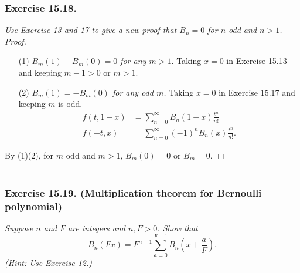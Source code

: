 \documentclass{article}
\begin{document}



\subsubsection*{Exercise 15.18.}
\emph{Use Exercise 13 and 17 to give a new proof that
$B_n = 0$ for $n$ odd and $n > 1$.} \\

\emph{Proof.}
\begin{enumerate}
\item[(1)]
\emph{$B_m(1) - B_m(0) = 0$ for any $m > 1$.}
Taking $x = 0$ in Exercise 15.13 and keeping $m - 1 > 0$ or $m > 1$.
\item[(2)]
\emph{$B_m(1) = -B_m(0)$ for any odd $m$.}
Taking $x = 0$ in Exercise 15.17 and keeping $m$ is odd.
\begin{align*}
f(t, 1-x)
&= \sum_{n=0}^{\infty} B_n(1-x) \frac{t^n}{n!} \\
f(-t, x)
&= \sum_{n=0}^{\infty} (-1)^n B_n(x) \frac{t^n}{n!}.
\end{align*}
\end{enumerate}
By (1)(2), for $m$ odd and $m > 1$, $B_m(0) = 0$ or $B_m = 0$.
$\Box$ \\\\






\subsubsection*{Exercise 15.19. (Multiplication theorem for Bernoulli polynomial)}
\emph{Suppose $n$ and $F$ are integers and $n, F > 0$. Show that
$$B_n(Fx) = F^{n-1} \sum_{a=0}^{F-1} B_n \left(x + \frac{a}{F} \right).$$
(Hint: Use Exercise 12.)} \\
\end{document}
